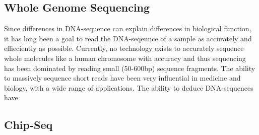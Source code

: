 
\subsection{Whole Genome Sequencing}
Since differences in DNA-sequence can explain differences in biological function, it has long been a goal to read the DNA-seqeunce of a sample as accurately and effieciently as possible.
Currently, no technology exists to accurately sequence whole molecules like a human chromosome with accuracy and thus sequencing has been dominated by reading small (50-600bp) sequence fragments.
The ability to massively sequence short reads have been very influential in medicine and biology, with a wide range of applications.
The ability to deduce DNA-sequences have 

\subsection{Chip-Seq}


